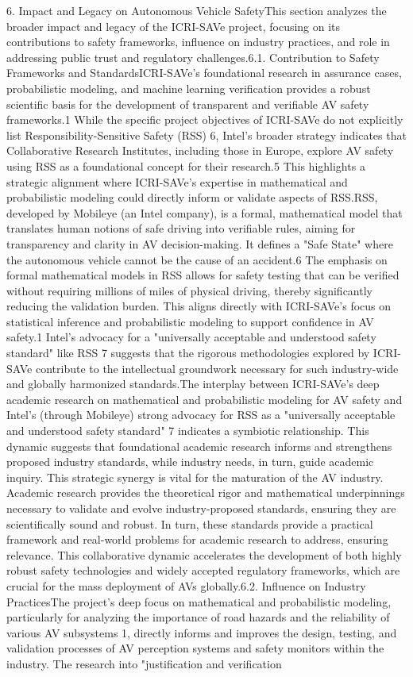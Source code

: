 6. Impact and Legacy on Autonomous Vehicle SafetyThis section analyzes the broader impact and legacy of the ICRI-SAVe project, focusing on its contributions to safety frameworks, influence on industry practices, and role in addressing public trust and regulatory challenges.6.1. Contribution to Safety Frameworks and StandardsICRI-SAVe's foundational research in assurance cases, probabilistic modeling, and machine learning verification provides a robust scientific basis for the development of transparent and verifiable AV safety frameworks.1 While the specific project objectives of ICRI-SAVe do not explicitly list Responsibility-Sensitive Safety (RSS) 6, Intel's broader strategy indicates that Collaborative Research Institutes, including those in Europe, explore AV safety using RSS as a foundational concept for their research.5 This highlights a strategic alignment where ICRI-SAVe's expertise in mathematical and probabilistic modeling could directly inform or validate aspects of RSS.RSS, developed by Mobileye (an Intel company), is a formal, mathematical model that translates human notions of safe driving into verifiable rules, aiming for transparency and clarity in AV decision-making. It defines a "Safe State" where the autonomous vehicle cannot be the cause of an accident.6 The emphasis on formal mathematical models in RSS allows for safety testing that can be verified without requiring millions of miles of physical driving, thereby significantly reducing the validation burden. This aligns directly with ICRI-SAVe's focus on statistical inference and probabilistic modeling to support confidence in AV safety.1 Intel's advocacy for a "universally acceptable and understood safety standard" like RSS 7 suggests that the rigorous methodologies explored by ICRI-SAVe contribute to the intellectual groundwork necessary for such industry-wide and globally harmonized standards.The interplay between ICRI-SAVe's deep academic research on mathematical and probabilistic modeling for AV safety and Intel's (through Mobileye) strong advocacy for RSS as a "universally acceptable and understood safety standard" 7 indicates a symbiotic relationship. This dynamic suggests that foundational academic research informs and strengthens proposed industry standards, while industry needs, in turn, guide academic inquiry. This strategic synergy is vital for the maturation of the AV industry. Academic research provides the theoretical rigor and mathematical underpinnings necessary to validate and evolve industry-proposed standards, ensuring they are scientifically sound and robust. In turn, these standards provide a practical framework and real-world problems for academic research to address, ensuring relevance. This collaborative dynamic accelerates the development of both highly robust safety technologies and widely accepted regulatory frameworks, which are crucial for the mass deployment of AVs globally.6.2. Influence on Industry PracticesThe project's deep focus on mathematical and probabilistic modeling, particularly for analyzing the importance of road hazards and the reliability of various AV subsystems 1, directly informs and improves the design, testing, and validation processes of AV perception systems and safety monitors within the industry. The research into "justification and verification 